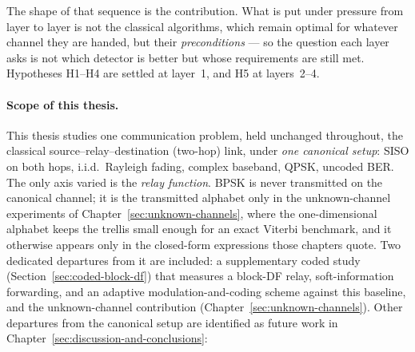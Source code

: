 The shape of that sequence is the contribution. What is put under pressure from layer to layer is not the classical algorithms, which remain optimal for whatever channel they are handed, but their \emph{preconditions} --- so the question each layer asks is not which detector is better but whose requirements are still met. Hypotheses H1--H4 are settled at layer~1, and H5 at layers~2--4.

\paragraph{Scope of this thesis.}
This thesis studies one communication problem, held unchanged throughout, the classical
source--relay--destination (two-hop) link, under \emph{one canonical setup}:
SISO on both hops, i.i.d.\ Rayleigh fading, complex baseband, QPSK, uncoded
BER. The only axis varied is the \emph{relay
function}. BPSK is never transmitted on the canonical channel; it is the
transmitted alphabet only in the unknown-channel experiments of
Chapter~\ref{sec:unknown-channels}, where the one-dimensional alphabet keeps the
trellis small enough for an exact Viterbi benchmark, and it otherwise appears
only in the closed-form expressions those chapters quote. Two dedicated departures from it are included: a supplementary coded study (Section~\ref{sec:coded-block-df}) that measures a block-DF relay, soft-information forwarding, and an adaptive modulation-and-coding scheme against this baseline, and the unknown-channel contribution (Chapter~\ref{sec:unknown-channels}). Other departures from the canonical setup are identified as future work in Chapter~\ref{sec:discussion-and-conclusions}:

